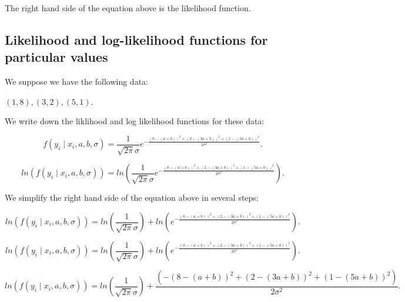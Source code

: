 \documentclass[a5paper,11pt]{article}
\begin{document}
The right hand side of the equation above is the likelihood function.

\subsection{Likelihood and log-likelihood functions for particular values}

We suppose we have the following data:

$\left(1,8\right), \left(3,2\right), \left(5,1\right)$.

We write down the liklihood and log likelihood functions for these
data:

\begin{equation}
f\left(y_i \mid x_i, a, b, \sigma\right)
 =  \frac{1}{\sqrt{2\pi}\sigma}
	e^{-
		\frac{
			\left( 8 -\left(a +b\right)\right)^2
			+ \left( 2 -\left(3a +b\right)\right)^2
			+ \left( 1 -\left(5a +b\right)\right)^2
		  }
		{2\sigma^2}
	  }.
\end{equation}


\begin{equation}
ln \left( f\left(y_i \mid x_i, a, b, \sigma\right) \right)
 =  ln \left( \frac{1}{\sqrt{2\pi}\sigma}
	e^{-
		\frac{
			\left( 8 -\left(a +b\right)\right)^2
			+ \left( 2 -\left(3a +b\right)\right)^2
			+ \left( 1 -\left(5a +b\right)\right)^2
		  }
		{2\sigma^2}
	  } \right).
\end{equation}

We simplify the right hand side of the equation above in several steps:

\begin{equation}
ln \left( f\left(y_i \mid x_i, a, b, \sigma\right) \right)
 =  ln \left( \frac{1}{\sqrt{2\pi}\sigma} \right) + 
	ln \left( e^{-
		\frac{
			\left( 8 -\left(a +b\right)\right)^2
			+ \left( 2 -\left(3a +b\right)\right)^2
			+ \left( 1 -\left(5a +b\right)\right)^2
		  }
		{2\sigma^2}
	  } \right).
\end{equation}


\begin{equation}
ln \left( f\left(y_i \mid x_i, a, b, \sigma\right) \right)
 =  ln \left( \frac{1}{\sqrt{2\pi}\sigma} \right) + 
	ln \left( e^{-
		\frac{
			\left( 8 -\left(a +b\right)\right)^2
			+ \left( 2 -\left(3a +b\right)\right)^2
			+ \left( 1 -\left(5a +b\right)\right)^2
		  }
		{2\sigma^2}
	  } \right).
\end{equation}

\begin{equation}
ln \left( f\left(y_i \mid x_i, a, b, \sigma\right) \right)
 =  ln \left( \frac{1}{\sqrt{2\pi}\sigma} \right) + 
		\frac{
			\left(-\left( 8 -\left(a +b\right)\right)^2
			+ \left( 2 -\left(3a +b\right)\right)^2
			+ \left( 1 -\left(5a +b\right)\right)^2\right)
		  }
		{2\sigma^2}.
\end{equation}
\end{document}

